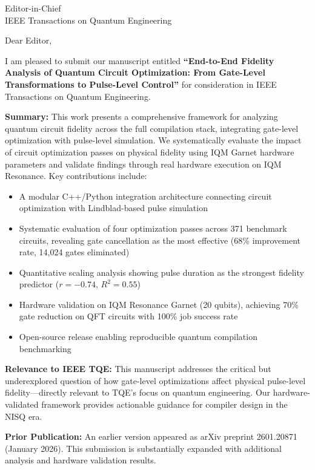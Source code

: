 \documentclass[11pt]{letter}
\begin{document}
\begin{letter}{Editor-in-Chief\\
IEEE Transactions on Quantum Engineering}

\opening{Dear Editor,}

I am pleased to submit our manuscript entitled \textbf{``End-to-End Fidelity Analysis of Quantum Circuit Optimization: From Gate-Level Transformations to Pulse-Level Control''} for consideration in IEEE Transactions on Quantum Engineering.

\textbf{Summary:} This work presents a comprehensive framework for analyzing quantum circuit fidelity across the full compilation stack, integrating gate-level optimization with pulse-level simulation. We systematically evaluate the impact of circuit optimization passes on physical fidelity using IQM Garnet hardware parameters and validate findings through real hardware execution on IQM Resonance. Key contributions include:

\begin{itemize}
    \item A modular C++/Python integration architecture connecting circuit optimization with Lindblad-based pulse simulation
    \item Systematic evaluation of four optimization passes across 371 benchmark circuits, revealing gate cancellation as the most effective (68\% improvement rate, 14,024 gates eliminated)
    \item Quantitative scaling analysis showing pulse duration as the strongest fidelity predictor ($r = -0.74$, $R^2 = 0.55$)
    \item Hardware validation on IQM Resonance Garnet (20 qubits), achieving 70\% gate reduction on QFT circuits with 100\% job success rate
    \item Open-source release enabling reproducible quantum compilation benchmarking
\end{itemize}

\textbf{Relevance to IEEE TQE:} This manuscript addresses the critical but underexplored question of how gate-level optimizations affect physical pulse-level fidelity---directly relevant to TQE's focus on quantum engineering. Our hardware-validated framework provides actionable guidance for compiler design in the NISQ era.

\textbf{Prior Publication:} An earlier version appeared as arXiv preprint 2601.20871 (January 2026). This submission is substantially expanded with additional analysis and hardware validation results.


\end{letter}
\end{document}
